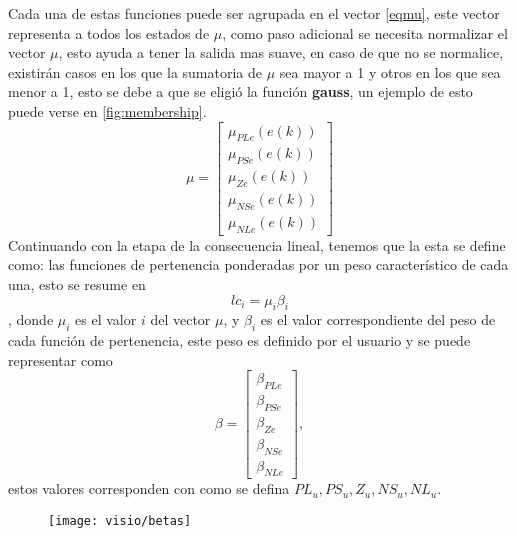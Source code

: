     
    Cada una de estas funciones puede ser agrupada en el vector \cref{eqmu}, este vector representa a todos los estados de $\mu$, como paso adicional se necesita normalizar el vector $\mu$, esto ayuda a tener la salida mas suave, en caso de que no se normalice, existirán casos en los que la sumatoria de $\mu$ sea mayor a 1 y otros en los que sea menor a 1, esto se debe a que se eligió la función \textbf{gauss}, un ejemplo de esto puede verse en \cref{fig:membership}.
    \begin{equation}
    \label{eqmu}
    \mu=\begin{bmatrix}
    \mu_{PLe}(e(k)) \\ 
    \mu_{PSe}(e(k))\\ 
    \mu_{Ze}(e(k))\\ 
    \mu_{NSe}(e(k))\\ 
    \mu_{NLe}(e(k))
    \end{bmatrix} 
    \end{equation}
    Continuando con la etapa de la consecuencia lineal, tenemos que la esta se define como: las funciones de pertenencia ponderadas por un peso característico de cada una, esto se resume en \begin{equation} 
    lc_i= \mu_i \beta_i
    \end{equation}, donde $\mu_i$ es el valor $i$ del vector $\mu$, y $\beta_i$ es el valor correspondiente del peso de cada función de pertenencia, este peso es definido por el usuario y se puede representar como \begin{equation}
    \beta=\begin{bmatrix}
    \beta_{PLe} \\ 
    \beta_{PSe}\\ 
    \beta_{Ze}\\ 
    \beta_{NSe}\\ 
    \beta_{NLe}
    \end{bmatrix} , 
    \end{equation} estos valores corresponden con como se defina $PL_u,PS_u,Z_u,NS_u,NL_u $. %
    
    
\begin{figure}[h]
	\centering
	\texttt{[image: visio/betas]}
	\caption{}
	\label{fig:betas}
\end{figure}
    
    
    
